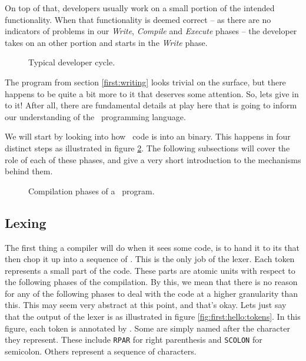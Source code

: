 On top of that, developers usually work on a small portion of the intended functionality. When that functionality is deemed correct -- as there are no indicators of problems in our \textsl{Write}, \textsl{Compile} and \textsl{Execute} phases -- the developer takes on an other portion and starts in the \textsl{Write} phase.

\begin{figure}[tbp]
  
  \caption{Typical developer cycle.}
  \label{fig:first:phases:cycle}
\end{figure}

\csharpsection{\csharp}

The program from section \ref{first:writing} looks trivial on the surface, but there happens to be quite a bit more to it that deserves some attention. So, lets give in to it! After all, there are fundamental details at play here that is going to inform our understanding of the \csharp\ programming language.

We will start by looking into how \csharp\ code is  into an  binary. This happens in four distinct steps as illustrated in figure \ref{fig:first:csharp:compilation:phases}. The following subsections will cover the role of each of these phases, and give a very short introduction to the mechanisms behind them.

\begin{figure}[tbp]
  
  \caption{Compilation phases of a \csharp\ program.}
  \label{fig:first:csharp:compilation:phases}
\end{figure}

\subsection{Lexing}

The first thing a compiler will do when it sees some code, is to hand it to its  that then chop it up into a sequence of . This is the only job of the lexer. Each token represents a small part of the code. These parts are atomic units with respect to the following phases of the compilation. By this, we mean that there is no reason for any of the following phases to deal with the code at a higher granularity than this. This may seem very abstract at this point, and that's okay. Lets just say that the output of the lexer is as illustrated in figure \ref{fig:first:hello:tokens}. In this figure, each token is annotated by . Some are simply named after the character they represent. These include \texttt{RPAR} for right parenthesis and \texttt{SCOLON} for semicolon. Others represent a sequence of characters.

